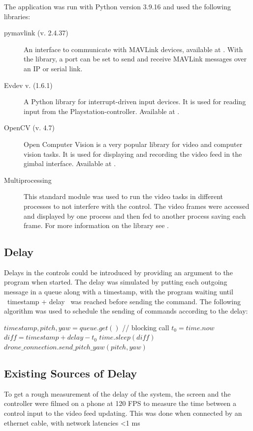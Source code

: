 \documentclass[nofilelist]{cslthse-msc}
\begin{document}
The application was run with Python version 3.9.16 and used the following libraries:
\begin{description} 
   \item [pymavlink (v. 2.4.37)]
   An interface to communicate with MAVLink devices, available at \cite{pymavlink}. With the library, a port can be set to send and receive MAVLink messages over an IP or serial link.
 
   \item [Evdev v. (1.6.1)]
   A Python library for interrupt-driven input devices. It is used for reading input from the Playstation-controller. Available at \cite{evdev}.

   \item [OpenCV (v. 4.7)] 
   Open Computer Vision is a very popular library for video and computer vision tasks. It is used for displaying and recording the video feed in the gimbal interface. Available at \cite{opencv}.

   \item[Multiprocessing]
   This standard module was used to run the video tasks in different processes to not interfere with the control. The video frames were accessed and displayed by one process and then fed to another process saving each frame. For more information on the library see \cite{multiprocessing}.  
\end{description}

\subsection{Delay}
Delays in the controls could be introduced by providing an argument to the program when started. The delay was simulated by putting each outgoing message in a queue along with a timestamp, with the program waiting until \ timestamp + delay \ was reached before sending the command. The following algorithm was used to schedule the sending of commands according to the delay:
\begin{algorithmic}
   \State $timestamp, pitch, yaw = queue.get()$ // blocking call
   \State $t_{0} = time.now$
   \State $diff = timestamp + delay - t_{0}$
      \State $time.sleep(diff)$
   \EndIf
   \State $drone\_connection.send\_pitch\_yaw(pitch, yaw)$
   \EndWhile
\end{algorithmic}

\subsection{Existing Sources of Delay}
To get a rough measurement of the delay of the system, the screen and the controller were filmed on a phone at 120 FPS to measure the time between a control input to the video feed updating. This was done when connected by an ethernet cable, with network latencies <1 ms
\end{document}
